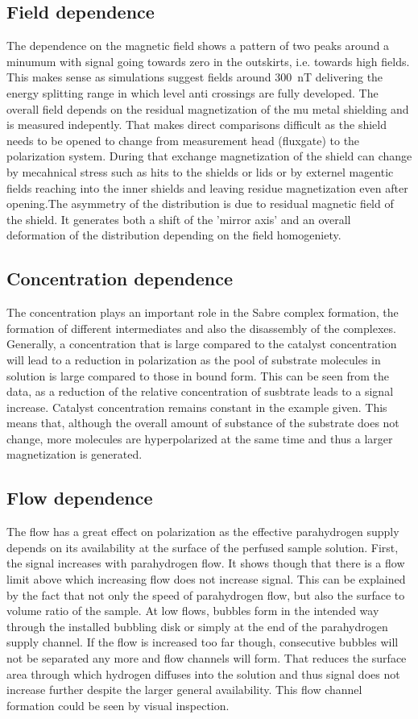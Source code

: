         \subsection{Field dependence}
            The dependence on the magnetic field shows a pattern of two peaks around a minumum with signal going towards zero in the outskirts, i.e. towards high fields. This makes sense as simulations suggest fields around \SI{300}{\nano\tesla} delivering the energy splitting range in which level anti crossings are fully developed. The overall field depends on the residual magnetization of the mu metal shielding and is measured indepently. That makes direct comparisons difficult as the shield needs to be opened to change from measurement head (fluxgate) to the polarization system. During that exchange magnetization of the shield can change by mecahnical stress such as hits to the shields or lids or by externel magentic fields reaching into the inner shields and leaving residue magnetization even after opening.The asymmetry of the distribution is due to residual magnetic field of the shield. It generates both a shift of the 'mirror axis' and an overall deformation of the distribution depending on the field homogeniety.
        \subsection{Concentration dependence}
            The concentration plays an important role in the Sabre complex formation, the formation of different intermediates and also the disassembly of the complexes. Generally, a concentration that is large compared to the catalyst concentration will lead to a reduction in polarization as the pool of substrate molecules in solution is large compared to those in bound form. This can be seen from the data, as a reduction of the relative concentration of susbtrate leads to a signal increase. Catalyst concentration remains constant in the example given. This means that, although the overall amount of substance of the substrate does not change, more molecules are hyperpolarized at the same time and thus a larger magnetization is generated.
        \subsection{Flow dependence}
            The flow has a great effect on polarization as the effective parahydrogen supply depends on its availability at the surface of the perfused sample solution. First, the signal increases with parahydrogen flow. It shows though that there is a flow limit above which increasing flow does not increase signal. This can be explained by the fact that not only the speed of parahydrogen flow, but also the surface to volume ratio of the sample. At low flows, bubbles form in the intended way through the installed bubbling disk or simply at the end of the parahydrogen supply channel. If the flow is increased too far though, consecutive bubbles will not be separated any more and flow channels will form. That reduces the surface area through which hydrogen diffuses into the solution and thus signal does not increase further despite the larger general availability. This flow channel formation could be seen by visual inspection.
